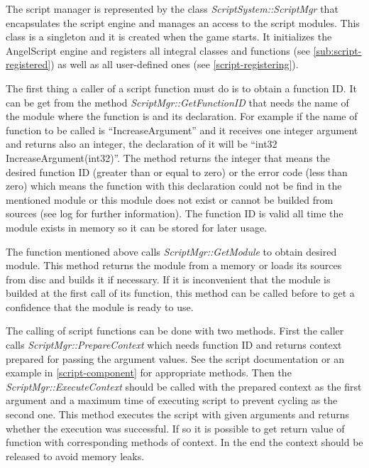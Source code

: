 The script manager is represented by the class \emph{ScriptSystem::ScriptMgr} that encapsulates the script engine and manages an access to the script modules. This class is a singleton and it is created when the game starts. It initializes the AngelScript engine and registers all integral classes and functions (see \ref{sub:script-registered}) as well as all user-defined ones (see \ref{script-registering}).

The first thing a caller of a script function must do is to obtain a function ID. It can be get from the method \emph{ScriptMgr::GetFunctionID} that needs the name of the module where the function is and its declaration. For example if the name of function to be called is ``IncreaseArgument'' and it receives one integer argument and returns also an integer, the declaration of it will be ``int32 IncreaseArgument(int32)''. The method returns the integer that means the desired function ID (greater than or equal to zero) or the error code (less than zero) which means the function with this declaration could not be find in the mentioned module or this module does not exist or cannot be builded from sources (see log for further information). The function ID is valid all time the module exists in memory so it can be stored for later usage.

The function mentioned above calls \emph{ScriptMgr::GetModule} to obtain desired module. This method returns the module from a memory or loads its sources from disc and builds it if necessary. If it is inconvenient that the module is builded at the first call of its function, this method can be called before to get a confidence that the module is ready to use.

The calling of script functions can be done with two methods. First the caller calls \emph{ScriptMgr::PrepareContext} which needs function ID and returns context prepared for passing the argument values. See the script documentation \cite{angelscript} or an example in \ref{script-component} for appropriate methods. Then the \emph{ScriptMgr::ExecuteContext} should be called with the prepared context as the first argument and a maximum time of executing script to prevent cycling as the second one. This method executes the script with given arguments and returns whether the execution was successful. If so it is possible to get return value of function with corresponding methods of context. In the end the context should be released to avoid memory leaks.

